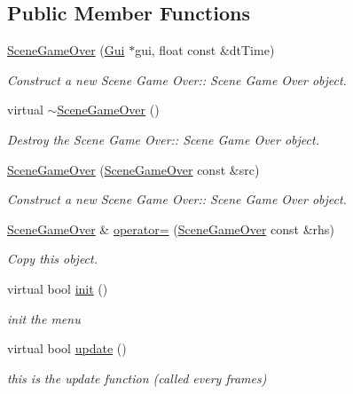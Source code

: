 \subsection*{Public Member Functions}
\begin{DoxyCompactItemize}
\item 
\hyperlink{class_scene_game_over_a450e4074509d54e63d26b87920e96e61}{Scene\+Game\+Over} (\hyperlink{class_gui}{Gui} $\ast$gui, float const \&dt\+Time)
\begin{DoxyCompactList}\small\item\em Construct a new Scene Game Over\+:\+: Scene Game Over object. \end{DoxyCompactList}\item 
\mbox{\label{class_scene_game_over_a6225515145cf6e70aad5bba49640d198}} 
virtual \hyperlink{class_scene_game_over_a6225515145cf6e70aad5bba49640d198}{$\sim$\+Scene\+Game\+Over} ()
\begin{DoxyCompactList}\small\item\em Destroy the Scene Game Over\+:\+: Scene Game Over object. \end{DoxyCompactList}\item 
\hyperlink{class_scene_game_over_a9f3f1928f1aec8b940566a51ff5e6f63}{Scene\+Game\+Over} (\hyperlink{class_scene_game_over}{Scene\+Game\+Over} const \&src)
\begin{DoxyCompactList}\small\item\em Construct a new Scene Game Over\+:\+: Scene Game Over object. \end{DoxyCompactList}\item 
\hyperlink{class_scene_game_over}{Scene\+Game\+Over} \& \hyperlink{class_scene_game_over_a3484a9ad054f0104cada049f4c06d060}{operator=} (\hyperlink{class_scene_game_over}{Scene\+Game\+Over} const \&rhs)
\begin{DoxyCompactList}\small\item\em Copy this object. \end{DoxyCompactList}\item 
virtual bool \hyperlink{class_scene_game_over_a7ddd370503e10ff64e3d023f0a0acdb8}{init} ()
\begin{DoxyCompactList}\small\item\em init the menu \end{DoxyCompactList}\item 
virtual bool \hyperlink{class_scene_game_over_ac4547b0ed87f3c324e75dafb8f96b5af}{update} ()
\begin{DoxyCompactList}\small\item\em this is the update function (called every frames) \end{DoxyCompactList}\item 

\end{DoxyCompactItemize}
